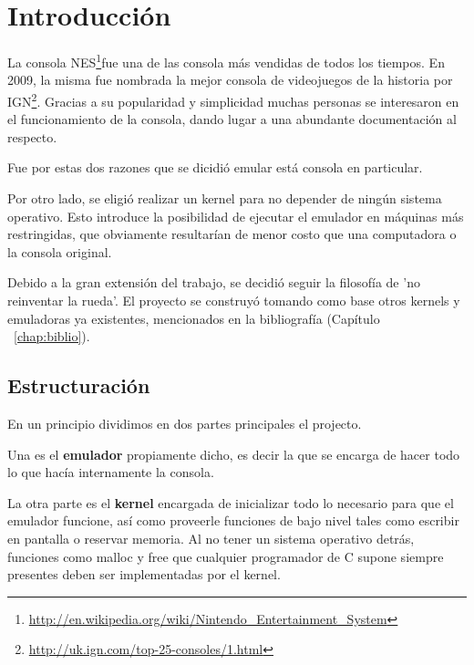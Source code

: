 \chapter{Introducción}
La consola NES\footnote{\url{http://en.wikipedia.org/wiki/Nintendo_Entertainment_System}}fue una de las consola más vendidas de todos los tiempos. En 2009, la misma fue nombrada la mejor consola de videojuegos de la historia por IGN\footnote{\url{http://uk.ign.com/top-25-consoles/1.html}}.
Gracias a su popularidad y simplicidad muchas personas se interesaron en el funcionamiento de la consola, dando lugar a una abundante documentación al respecto.

Fue por estas dos razones que se dicidió emular está consola en particular.

Por otro lado, se eligió realizar un kernel para no depender de ningún sistema operativo. Esto introduce la posibilidad de ejecutar el emulador en máquinas más restringidas, que obviamente resultarían de menor costo que una computadora o la consola original.

Debido a la gran extensión del trabajo, se decidió seguir la filosofía de 'no reinventar la rueda'. El proyecto se construyó tomando como base otros kernels y emuladoras ya existentes, mencionados en la bibliografía (Capítulo ~\ref{chap:biblio}).

\section{Estructuración}

En un principio dividimos en dos partes principales el projecto.

Una es el \textbf{emulador} propiamente dicho, es decir la que se encarga de hacer todo lo que hacía internamente la consola.

La otra parte es el \textbf{kernel} encargada de inicializar todo lo necesario para que el emulador funcione, así como proveerle funciones de bajo nivel tales como escribir en pantalla o reservar memoria. Al no tener un sistema operativo detrás, funciones como malloc y free que cualquier programador de C supone siempre presentes deben ser implementadas por el kernel.
